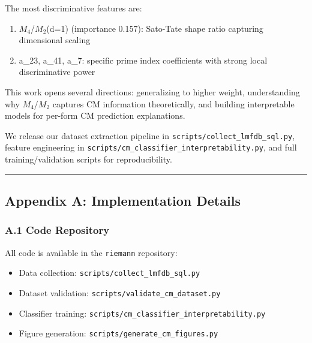 \documentclass[
]{article}
\providecommand{\tightlist}{%
  \setlength{\itemsep}{0pt}\setlength{\parskip}{0pt}}
\begin{document}
The most discriminative features are:

\begin{enumerate}
\def\labelenumi{\arabic{enumi}.}
\tightlist
\item
  $M_4$/$M_2$(d=1) (importance 0.157): Sato-Tate shape ratio capturing
  dimensional scaling
\item
  a\_23, a\_41, a\_7: specific prime index coefficients with strong
  local discriminative power
\end{enumerate}

This work opens several directions: generalizing to higher weight,
understanding why $M_4$/$M_2$ captures CM information theoretically, and
building interpretable models for per-form CM prediction explanations.

We release our dataset extraction pipeline in
\texttt{scripts/collect\_lmfdb\_sql.py}, feature engineering in
\texttt{scripts/cm\_classifier\_interpretability.py}, and full
training/validation scripts for reproducibility.

\begin{center}\rule{0.5\linewidth}{0.5pt}\end{center}

\hypertarget{appendix-a-implementation-details}{%
\subsection{Appendix A: Implementation
Details}\label{appendix-a-implementation-details}}

\hypertarget{a.1-code-repository}{%
\subsubsection{A.1 Code Repository}\label{a.1-code-repository}}

All code is available in the \texttt{riemann} repository:

\begin{itemize}
\tightlist
\item
  Data collection: \texttt{scripts/collect\_lmfdb\_sql.py}
\item
  Dataset validation: \texttt{scripts/validate\_cm\_dataset.py}
\item
  Classifier training:
  \texttt{scripts/cm\_classifier\_interpretability.py}
\item
  Figure generation: \texttt{scripts/generate\_cm\_figures.py}
\end{itemize}
\end{document}
